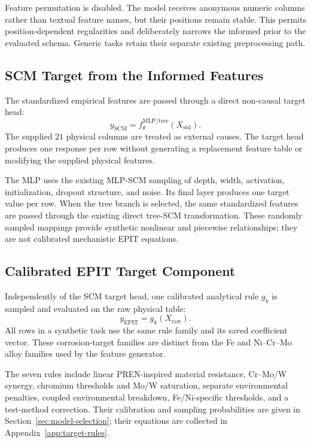 \documentclass{article}
\begin{document}
Feature permutation is disabled. The model receives anonymous numeric columns
rather than textual feature names, but their positions remain stable. This
permits position-dependent regularities and deliberately narrows the informed
prior to the evaluated schema. Generic tasks retain their separate existing
preprocessing path.

\subsection{SCM Target from the Informed Features}

The standardized empirical features are passed through a direct non-causal
target head:
\begin{equation}
y_{\mathrm{SCM}}=f_{\theta}^{\mathrm{MLP/tree}}(X_{\mathrm{std}}).
\label{eq:scm-target}
\end{equation}
The supplied \(21\) physical columns are treated as external causes. The
target head produces one response per row without generating a replacement
feature table or modifying the supplied physical features.

The MLP uses the existing MLP-SCM sampling of depth, width, activation,
initialization, dropout structure, and noise. Its final layer produces one
target value per row. When the tree branch is selected, the same standardized
features are passed through the existing direct tree-SCM transformation.
These randomly sampled mappings provide synthetic nonlinear and piecewise
relationships; they are not calibrated mechanistic EPIT equations.

\subsection{Calibrated EPIT Target Component}

Independently of the SCM target head, one calibrated analytical rule \(g_k\)
is sampled and evaluated on the raw physical table:
\begin{equation}
y_{\mathrm{EPIT}}=g_k(X_{\mathrm{raw}}).
\label{eq:epit-target}
\end{equation}
All rows in a synthetic task use the same rule family and its saved
coefficient vector. These corrosion-target families are distinct from the Fe
and Ni--Cr--Mo alloy families used by the feature generator.

The seven rules include linear PREN-inspired material resistance, Cr--Mo/W
synergy, chromium thresholds and Mo/W saturation, separate environmental
penalties, coupled environmental breakdown, Fe/Ni-specific thresholds, and a
test-method correction. Their calibration and sampling probabilities are
given in Section~\ref{sec:model-selection}; their equations are collected in
Appendix~\ref{app:target-rules}.
\end{document}
